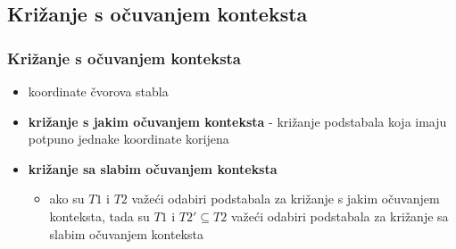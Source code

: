 \documentclass{beamer}
\begin{document}
\subsection{Križanje s očuvanjem konteksta}
\begin{frame}
\frametitle{Križanje s očuvanjem konteksta}
\centering

\begin{itemize}
\item{koordinate čvorova stabla}
\end{itemize}

\begin{itemize}
\item{\textbf{križanje s jakim očuvanjem konteksta} - križanje podstabala koja imaju potpuno jednake koordinate korijena}
\item{ \textbf{križanje sa slabim očuvanjem konteksta}
	\begin{itemize}
	\item{ako su $T1$ i $T2$ važeći odabiri podstabala za križanje s jakim očuvanjem konteksta, 		tada su $T1$ i $T2' \subseteq T2$ važeći odabiri podstabala za križanje sa slabim očuvanjem 		konteksta}
	
	\end{itemize}
}
\end{itemize}

\end{frame}

\end{document}
